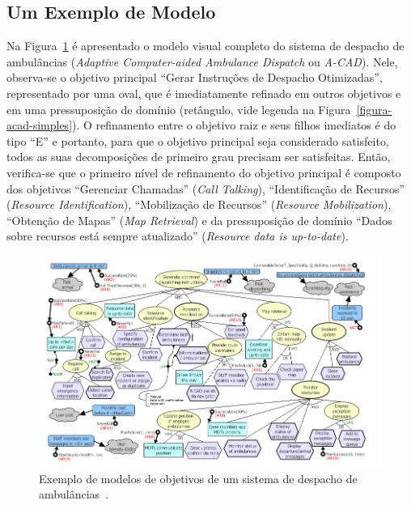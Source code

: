 \subsection{Um Exemplo de Modelo \gore}
\label{sec-referencial-engenharia-objetivos-exemplo}

Na Figura~\ref{figura-acad-completo} é apresentado o modelo visual completo do sistema de despacho de ambulâncias (\textit{Adaptive Computer-aided Ambulance Dispatch} ou \textit{A-CAD}). Nele, observa-se o objetivo principal ``Gerar Instruções de Despacho Otimizadas'', representado por uma oval, que é imediatamente refinado em outros objetivos e em uma pressuposição de domínio (retângulo, vide legenda na Figura~\ref{figura-acad-simples}). O refinamento entre o objetivo raiz e seus filhos imediatos é do tipo ``E'' e portanto, para que o objetivo principal seja considerado satisfeito, todos as suas decomposições de primeiro grau precisam ser satisfeitas. Então, verifica-se que o primeiro nível de refinamento do objetivo principal é composto dos objetivos ``Gerenciar Chamadas'' (\textit{Call Talking}), ``Identificação de Recursos'' (\textit{Resource Identification}), ``Mobilização de Recursos'' (\textit{Resource Mobilization}), ``Obtenção de Mapas'' (\textit{Map Retrieval}) e da pressuposição de domínio ``Dados sobre recursos está sempre atualizado'' (\textit{Resource data is up-to-date}).


\begin{figure}
	\centering
	\includegraphics[width=1\textwidth]{figuras/modelos/ACAD-Completo.png}
	\caption{Exemplo de modelos de objetivos de um sistema de despacho de ambulâncias~\cite{tesevitor}.}
	\label{figura-acad-completo}
\end{figure}

